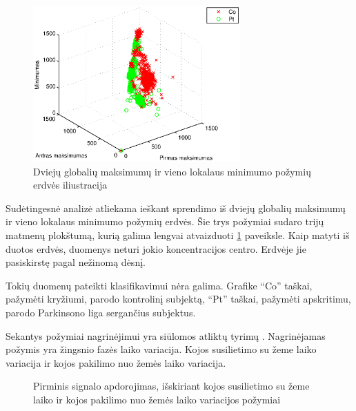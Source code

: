 \documentclass[]{vgtuef}
\begin{document}
\begin{figure}[!t]
  \centering
  \includegraphics[width=300px]{figures/maximums_minimums.eps}
  \caption{Dviejų globalių maksimumų ir vieno lokalaus minimumo požymių erdvės iliustracija}
  \label{fig:max_min}
\end{figure}

Sudėtingesnė analizė atliekama ieškant sprendimo iš dviejų globalių maksimumų ir vieno lokalaus minimumo požymių erdvės. Šie trys požymiai sudaro trijų matmenų plokštumą, kurią galima lengvai atvaizduoti \ref{fig:max_min} paveiksle. Kaip matyti iš duotos erdvės, duomenys neturi jokio koncentracijos centro. Erdvėje jie pasiskirstę pagal nežinomą dėsnį.

Tokių duomenų pateikti klasifikavimui nėra galima. Grafike ``Co'' taškai, pažymėti kryžiumi, parodo kontrolinį subjektą, ``Pt'' taškai, pažymėti apskritimu, parodo Parkinsono liga sergančius subjektus.

Sekantys požymiai nagrinėjimui yra siūlomos atliktų tyrimų \cite{16053531,KNUTSSON01011972,Delval_Salleron_Bourriez_Bleuse_Moreau_Krystkowiak_Defebvre_Devos_Duhamel_2008}. Nagrinėjamas požymis yra žingsnio fazės laiko variacija. Kojos susilietimo su žeme laiko variacija ir kojos pakilimo nuo žemės laiko variacija.

\begin{figure}[H]
  \centering
  
  \caption{Pirminis signalo apdorojimas, išskiriant kojos susilietimo su žeme laiko ir kojos pakilimo nuo žemės laiko variacijos požymiai}
  \label{fig:stance_swing_extract}
\end{figure}
\end{document}
